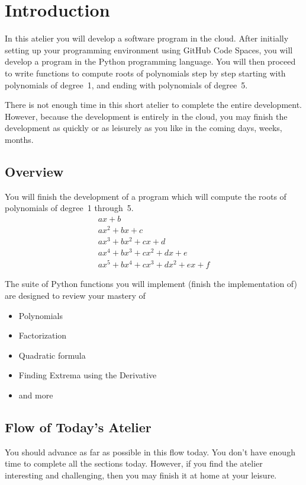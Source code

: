 \section{Introduction}
\label{sec.intro}

In this atelier you will develop a software program in the cloud.  After
initially setting up your programming environment using GitHub Code Spaces, you
will develop a  program in the
Python programming language.  You will then proceed to write functions
to compute roots of polynomials step by step starting with polynomials
of degree~1, and ending with polynomials of degree~5.

There is not enough time in this short atelier to complete the entire
development.  However, because the development is entirely in the
cloud, you may finish the development as quickly or as leisurely as
you like in the coming days, weeks, months.

\subsection{Overview}

You will finish the development of a program which will compute the
roots of polynomials of degree~1 through~5.
\begin{align*}
  a x + b\\
  a x^2 + b x + c\\
  a x^3 + b x^2 + c x + d\\
  a x^4 + b x^3 + c x^2 + d x + e\\
  a x^5 + b x^4 + c x^3 + d x^2 + e x + f
\end{align*}

The suite of Python functions you will implement (finish the
implementation of) are designed to review your mastery of
\begin{itemize}
\item Polynomials
\item Factorization
\item Quadratic formula
\item Finding Extrema using the Derivative
\item and more
\end{itemize}

\subsection{Flow of Today's Atelier}
You should advance as far as possible in this flow today.  You don't have
enough time to complete all the sections today.  However, if you find the
atelier interesting and challenging, then you may finish it at home at
your leisure.

